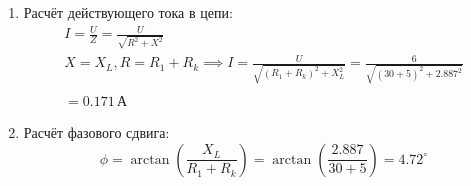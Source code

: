\begin{enumerate}
	\item Расчёт действующего тока в цепи:
	      \[
		      \begin{gathered}
			      I = \frac{U}{Z} = \frac{U}{\sqrt{R^2 + X^2}} \\
			      X = X_L, R = R_1 + R_k \implies I = \frac{U}{\sqrt{(R_1+R_k)^2+X_L^2}} = \frac{6}{\sqrt{(30+5)^2+2.887^2}} \\
			      \\
			      = 0.171 \, \text{А}
		      \end{gathered}
	      \]
	\item Расчёт фазового сдвига:
	      \[
		      \phi = \arctan\left(\frac{X_L}{R_1+R_k}\right) = \arctan\left(\frac{2.887}{30+5}\right) = 4.72^{\circ}
	      \]
\end{enumerate}
